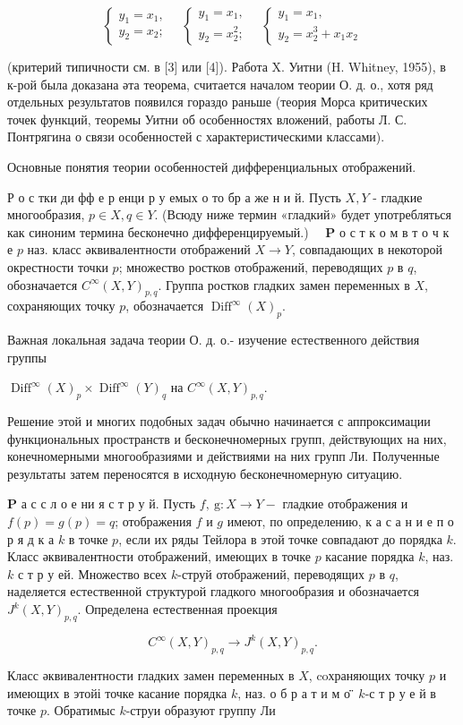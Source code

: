 \documentclass[10pt]{article}
\begin{document}
\[
\left\{\begin{array} { l } 
{ y _ { 1 } = x _ { 1 } , } \\
{ y _ { 2 } = x _ { 2 } ; }
\end{array} \quad \left\{\begin{array} { l } 
{ y _ { 1 } = x _ { 1 } , } \\
{ y _ { 2 } = x _ { 2 } ^ { 2 } ; }
\end{array} \quad \left\{\begin{array}{l}
y_{1}=x_{1}, \\
y_{2}=x_{2}^{3}+x_{1} x_{2}
\end{array}\right.\right.\right.
\]

(критерий типичности см. в [3] или [4]). Работа X. Уитни (H. Whitney, 1955), в к-рой была доказана әта теорема, считается началом теории О. д. о., хотя ряд отдельных результатов появился гораздо раньше (теория Морса критических точек функций, теоремы Уитни об особенностях вложений, работы Л. С. Понтрягина о связи особенностей с характеристическими классами).

Основные понятия теории особенностей дифференциальных отображений.

Р о с тки ди фф е р енци р у емых о то бр а же н и й. Пусть $X, Y$ - гладкие многообразия, $p \in X, q \in Y$. (Всюду ниже термин «гладкий» будет употребляться как синоним термина бесконечно дифференцируемый.) $\quad \mathbf{P}$ о с т к о м в т о ч к е $p$ наз. класс әквивалентности отображений $X \rightarrow Y$, совпадающих в некоторой окрестности точки $p$; множество ростков отображений, переводящих $p$ в $q$, обозначается $C^{\infty}(X, Y)_{p, q}$. Группа ростков гладких замен переменных в $X$, сохраняющих точку $p$, обозначается $\operatorname{Diff}^{\infty}(X)_{p}$.

Важная локальная задача теории О. д. о.- изучение естественного действия группы

$\operatorname{Diff}^{\infty}(X)_{p} \times \operatorname{Diff}^{\infty}(Y)_{q}$ на $C^{\infty}(X, Y)_{p, q}$.

Решение этой и многих подобных задач обычно начинается с аппроксимации функциональных пространств и бесконечномерных групп, действующих на них, конечномерными многообразиями и действиями на них групп Ли. Полученные результаты затем переносятся в исходную бесконечномерную ситуацию.

$\mathbf{P}$ а с с л о е ни я с т р у й. Пусть $f, \mathrm{~g}: X \rightarrow Y-$ гладкие отображения и $f(p)=g(p)=q$; отображения $f$ и $g$ имеют, по определению, к а с а н и е п о р я д к а $k$ в точке $p$, если их ряды Тейлора в этой точке совпадают до порядка $k$. Класс әквивалентности отображений, имеющих в точке $p$ касание порядка $k$, наз. $k$ с т р у ей. Множество всех $k$-струй отображений, переводящих $p$ в $q$, наделяется естественной структурой гладкого многообразия и обозначается $J^{k}(X, Y)_{p, q}$. Определена естественная проекция

\[
C^{\infty}(X, Y)_{p, q} \longrightarrow J^{k}(X, Y)_{p, q} .
\]

Класс әквивалентности гладких замен переменных в $X$, coхраняющих точку $p$ и имеющих в этойі точке касание порядка $k$, наз. о б р а т и м о ̈̈ $k$-с т р у е й в точке $p$. Обратимыс $k$-струи образуют группу Ли
\end{document}
